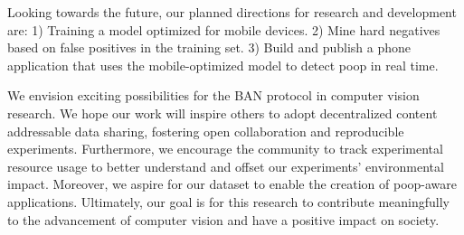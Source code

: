 \documentclass[10pt,twocolumn,letterpaper]{article}
\newif\ifnonanonymous
\newif\ifuseappendix
\newif\ifuseacknowledgement
\begin{document}
Looking towards the future, our planned directions for research and development are:
1) Training a model optimized for mobile devices.
2) Mine hard negatives based on false positives in the training set.
3) Build and publish a phone application that uses the mobile-optimized model to detect poop in real time.

We envision exciting possibilities for the BAN protocol in computer vision research.
We hope our work will inspire others to adopt decentralized content addressable data sharing, fostering open
  collaboration and reproducible experiments.
Furthermore, we encourage the community to track experimental resource usage to better understand and offset
  our experiments' environmental impact.
Moreover, we aspire for our dataset to enable the creation of poop-aware applications.
Ultimately, our goal is for this research to contribute meaningfully to the advancement of computer vision
  and have a positive impact on society.
  
  
\ifnonanonymous
\ifuseacknowledgement
\section{Acknowledgements}
We would would like to thank all of the dogs that produced subject matter for the dataset, all of the
  contributors for helping to construct a challenging test set, and Anthony Hoogs for several suggestions including taking the 
  third negative picture.

\fi
\fi

{\small


}


\ifuseappendix

\fi


%
\end{document}
